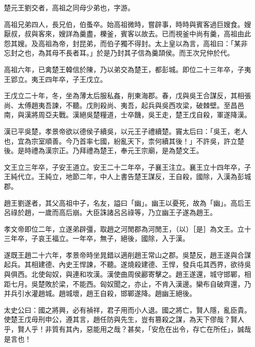 
\begin{pinyinscope}
楚元王劉交者，高祖之同母少弟也，字游。

高祖兄弟四人，長兄伯，伯蚤卒。始高祖微時，嘗辟事，時時與賓客過巨嫂食。嫂厭叔，叔與客來，嫂詳為羹盡，櫟釜，賓客以故去。已而視釜中尚有羹，高祖由此怨其嫂。及高祖為帝，封昆弟，而伯子獨不得封。太上皇以為言，高祖曰：「某非忘封之也，為其母不長者耳。」於是乃封其子信為羹頡侯。而王次兄仲於代。

高祖六年，已禽楚王韓信於陳，乃以弟交為楚王，都彭城。即位二十三年卒，子夷王郢立。夷王四年卒，子王戊立。

王戊立二十年，冬，坐為薄太后服私姦，削東海郡。春，戊與吳王合謀反，其相張尚、太傅趙夷吾諫，不聽。戊則殺尚、夷吾，起兵與吳西攻梁，破棘壁。至昌邑南，與漢將周亞夫戰。漢絕吳楚糧道，士卒饑，吳王走，楚王戊自殺，軍遂降漢。

漢已平吳楚，孝景帝欲以德侯子續吳，以元王子禮續楚。竇太后曰：「吳王，老人也，宜為宗室順善。今乃首率七國，紛亂天下，柰何續其後！」不許吳，許立楚後。是時禮為漢宗正。乃拜禮為楚王，奉元王宗廟，是為楚文王。

文王立三年卒，子安王道立。安王二十二年卒，子襄王注立。襄王立十四年卒，子王純代立。王純立，地節二年，中人上書告楚王謀反，王自殺，國除，入漢為彭城郡。

趙王劉遂者，其父高祖中子，名友，謚曰「幽」。幽王以憂死，故為「幽」。高后王呂祿於趙，一歲而高后崩。大臣誅諸呂呂祿等，乃立幽王子遂為趙王。

孝文帝即位二年，立遂弟辟彊，取趙之河閒郡為河閒王，（以）［是］為文王。立十三年卒，子哀王福立。一年卒，無子，絕後，國除，入于漢。

遂既王趙二十六年，孝景帝時坐晁錯以適削趙王常山之郡。吳楚反，趙王遂與合謀起兵。其相建德、內史王悍諫，不聽。遂燒殺建德、王悍，發兵屯其西界，欲待吳與俱西。北使匈奴，與連和攻漢。漢使曲周侯酈寄擊之。趙王遂還，城守邯鄲，相距七月。吳楚敗於梁，不能西。匈奴聞之，亦止，不肯入漢邊。欒布自破齊還，乃并兵引水灌趙城。趙城壞，趙王自殺，邯鄲遂降。趙幽王絕後。

太史公曰：國之將興，必有禎祥，君子用而小人退。國之將亡，賢人隱，亂臣貴。使楚王戊毋刑申公，遵其言，趙任防與先生，豈有篡殺之謀，為天下僇哉？賢人乎，賢人乎！非質有其內，惡能用之哉？甚矣，「安危在出令，存亡在所任」，誠哉是言也！


\end{pinyinscope}